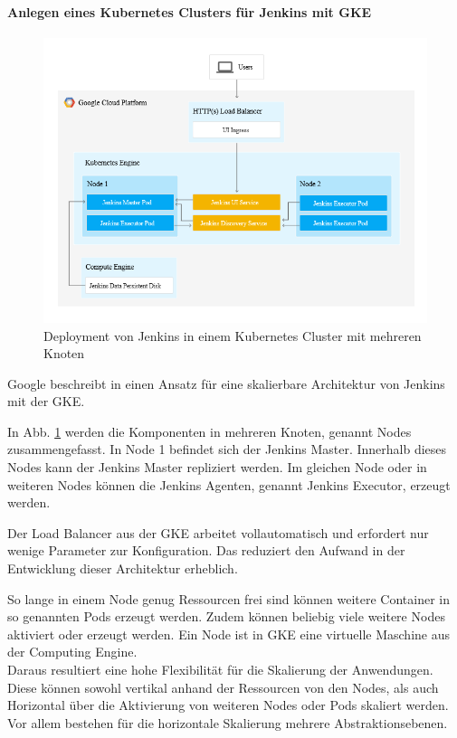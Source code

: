 \paragraph{Anlegen eines Kubernetes Clusters für Jenkins mit GKE}
\begin{figure}[htbp]
 \centering
 \includegraphics[width=1.0\textwidth]{gfx/jenkins-kubernetes-architecture.png}
 \caption{Deployment von Jenkins in einem Kubernetes Cluster mit mehreren Knoten \cite{Google:GKEJenkins}\label{fig:gkejenkins}}
\end{figure}

Google beschreibt in \cite{Google:GKEJenkins} einen Ansatz für eine skalierbare Architektur von Jenkins mit der \ac{GKE}.

In Abb. \ref{fig:gkejenkins} werden die Komponenten in mehreren Knoten, genannt Nodes zusammengefasst. In Node 1 befindet sich der Jenkins Master. Innerhalb dieses Nodes kann der Jenkins Master repliziert werden. Im gleichen Node oder in weiteren Nodes können die Jenkins Agenten, genannt Jenkins Executor, erzeugt werden.

Der Load Balancer aus der \ac{GKE} arbeitet vollautomatisch und erfordert nur wenige Parameter zur Konfiguration. Das reduziert den Aufwand in der Entwicklung dieser Architektur erheblich.

So lange in einem Node genug Ressourcen frei sind können weitere Container in so genannten Pods erzeugt werden. Zudem können beliebig viele weitere Nodes aktiviert oder erzeugt werden. Ein Node ist in \ac{GKE} eine virtuelle Maschine aus der Computing Engine.
\medskip
\\
Daraus resultiert eine hohe Flexibilität für die Skalierung der Anwendungen. Diese können sowohl vertikal anhand der Ressourcen von den Nodes, als auch Horizontal über die Aktivierung von weiteren Nodes oder Pods skaliert werden. Vor allem bestehen für die horizontale Skalierung mehrere Abstraktionsebenen.

